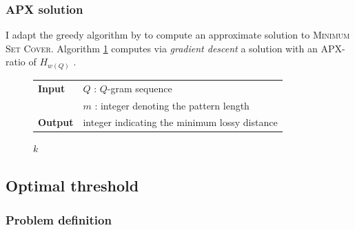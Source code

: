 \subsubsection{APX solution}

I adapt the greedy algorithm by \citeauthor{Chvatal1979} to compute an approximate solution to \textsc{Minimum Set Cover}.
Algorithm \ref{alg:qgram-maxdist-apx} computes via \emph{gradient descent} a solution with an APX-ratio of $H_{w(Q)}$ \citep{Chvatal1979}.

\begin{figure}[h]
\begin{center}
\begin{minipage}[t]{.8\textwidth}
\begin{algorithm}[H]
\begin{tabular}{ll}
\textbf{Input}  & $Q$ : $Q$-gram sequence\\
				& $m$ : integer denoting the pattern length\\
\textbf{Output} & integer indicating the minimum lossy distance\\
\end{tabular}
\begin{algorithmic}[1]
\EndWhile
\State \Return $k$
\end{algorithmic}
\label{alg:qgram-maxdist-apx}
\end{algorithm}
\end{minipage}
\end{center}
\end{figure}

\subsection{Optimal threshold}
\label{sub:qgram-optimal-threshold}


\subsubsection{Problem definition}

